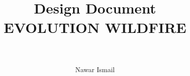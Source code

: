 \documentclass[12pt,a4paper]{report}
\author{Nawar Ismail}
\title{
	\HRule{0.5pt}\\
	Design Document\\
	\LARGE \textbf{\uppercase{Evolution WildFire}}\\
	\HRule{2pt}\\
}
\begin{document}
\begin{titlepage}
	\maketitle
\end{titlepage}
\end{document}
